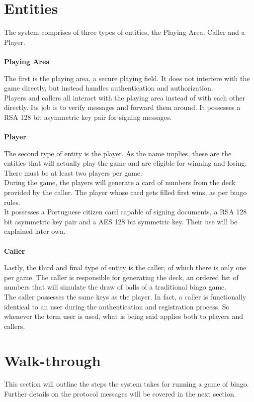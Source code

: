 \documentclass[11pt]{article}
\begin{document}
\section{Entities}
The system comprises of three types of entities, the Playing Area, Caller and a Player.
\\ \\ {\Large \textbf{Playing Area}} \par
The first is the playing area, a secure playing field. It does not interfere with the game directly, but instead handles authentication and authorization. \\
Players and callers all interact with the playing area instead of with each other directly. Its job is to verify messages and forward them around.
It possesses a RSA 128 bit asymmetric key pair for signing messages.
\\ \\ {\Large \textbf{Player}} \par
The second type of entity is the player. As the name implies, these are the entities that will actually play the game and are eligible for winning and losing. There must be at least two players per game. \\
During the game, the players will generate a card of numbers from the deck provided by the caller. The player whose card gets filled first wins, as per bingo rules. \\ It possesses a Portuguese citizen card capable of signing documents, a RSA 128 bit asymmetric key pair and a AES 128 bit symmetric key. Their use will be explained later own.
\\ \\ {\Large \textbf{Caller}} \par
Lastly, the third and final type of entity is the caller, of which there is only one per game. The caller is responsible for generating the deck, an ordered list of numbers that will simulate the draw of balls of a traditional bingo game.
\\The caller possesses the same keys as the player. In fact, a caller is functionally identical to an user during the authentication and registration process. So whenever the term user is used, what is being said applies both to players and callers.

\section{Walk-through}
This section will outline the steps the system takes for running a game of bingo. Further details on the protocol messages will be covered in the next section. 
\end{document}
